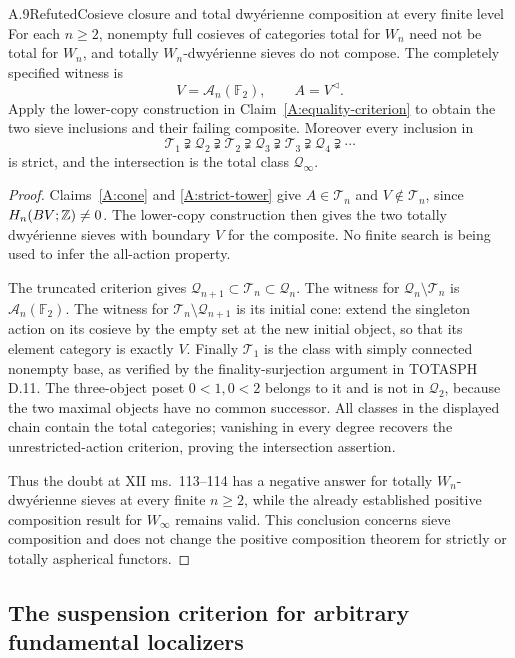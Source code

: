 \begin{claim}{A.9}{Refuted}{Cosieve closure and total dwy\'erienne composition at every finite level}\label{A:all-composition-failures}
For each $n\geq2$, nonempty full cosieves of categories total for $W_n$ need not be total for $W_n$, and totally $W_n$-dwy\'erienne sieves do not compose. The completely specified witness is
\[
 V=\mathcal A_n(\mathbb F_2),\qquad A=V^{\triangleleft}.
\]
Apply the lower-copy construction in Claim~\ref{A:equality-criterion} to obtain the two sieve inclusions and their failing composite. Moreover every inclusion in
\[
 \mathcal T_1\supsetneqq\mathcal Q_2\supsetneqq\mathcal T_2
 \supsetneqq\mathcal Q_3\supsetneqq\mathcal T_3
 \supsetneqq\mathcal Q_4\supsetneqq\cdots
\]
is strict, and the intersection is the total class $\mathcal Q_\infty$.
\end{claim}
\begin{proof}
Claims~\ref{A:cone} and \ref{A:strict-tower} give $A\in\mathcal T_n$ and $V\notin\mathcal T_n$, since $H_n(BV;\mathbb Z)\ne0$. The lower-copy construction then gives the two totally dwy\'erienne sieves with boundary $V$ for the composite. No finite search is being used to infer the all-action property.

The truncated criterion gives $\mathcal Q_{n+1}\subset\mathcal T_n\subset\mathcal Q_n$. The witness for $\mathcal Q_n\setminus\mathcal T_n$ is $\mathcal A_n(\mathbb F_2)$. The witness for $\mathcal T_n\setminus\mathcal Q_{n+1}$ is its initial cone: extend the singleton action on its cosieve by the empty set at the new initial object, so that its element category is exactly $V$. Finally $\mathcal T_1$ is the class with simply connected nonempty base, as verified by the finality-surjection argument in TOTASPH D.11. The three-object poset $0<1,0<2$ belongs to it and is not in $\mathcal Q_2$, because the two maximal objects have no common successor. All classes in the displayed chain contain the total categories; vanishing in every degree recovers the unrestricted-action criterion, proving the intersection assertion.

Thus the doubt at XII ms.~113--114 has a negative answer for totally $W_n$-dwy\'erienne sieves at every finite $n\geq2$, while the already established positive composition result for $W_\infty$ remains valid. This conclusion concerns sieve composition and does not change the positive composition theorem for strictly or totally aspherical functors.
\end{proof}

\subsection{The suspension criterion for arbitrary fundamental localizers}

